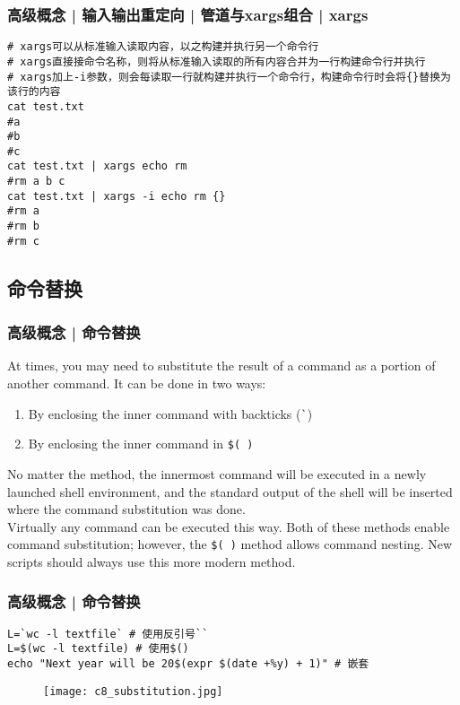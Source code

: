 \begin{frame}[fragile]
  \frametitle{高级概念 | 输入输出重定向 | 管道与xargs组合 | xargs}
\begin{lstlisting}
# xargs可以从标准输入读取内容，以之构建并执行另一个命令行
# xargs直接接命令名称，则将从标准输入读取的所有内容合并为一行构建命令行并执行
# xargs加上-i参数，则会每读取一行就构建并执行一个命令行，构建命令行时会将{}替换为该行的内容
cat test.txt
#a
#b
#c
cat test.txt | xargs echo rm
#rm a b c
cat test.txt | xargs -i echo rm {}
#rm a
#rm b
#rm c
\end{lstlisting}
\end{frame}

\subsection{命令替换}
\begin{frame}[fragile]
  \frametitle{高级概念 | 命令替换}
  At times, you may need to substitute the result of a command as a portion of another command. It can be done in two ways:
  \begin{enumerate}
    \item By enclosing the inner command with backticks (\verb|`|)
    \item By enclosing the inner command in \verb|$( )|
  \end{enumerate}
  No matter the method, the innermost command will be executed in a newly launched shell environment, and the standard output of the shell will be inserted where the command substitution was done.\\
  \vspace{0.3cm}
  Virtually any command can be executed this way. Both of these methods enable command substitution; however, the \verb|$( )| method allows command nesting. New scripts should always use this more modern method.
\end{frame}

\begin{frame}[fragile]
  \frametitle{高级概念 | \alert{命令替换}}
\begin{lstlisting}
L=`wc -l textfile` # 使用反引号``
L=$(wc -l textfile) # 使用$()
echo "Next year will be 20$(expr $(date +%y) + 1)" # 嵌套
\end{lstlisting}
  \begin{figure}
    \centering
    \texttt{[image: c8\_substitution.jpg]}
  \end{figure}
\end{frame}

